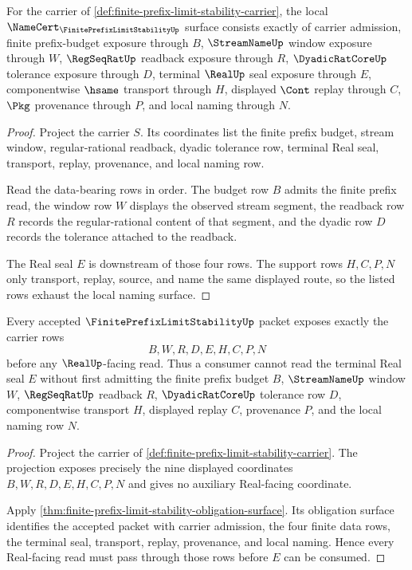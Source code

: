 \begin{theorem}
\label{thm:finite-prefix-limit-stability-obligation-surface}
For the carrier of \autoref{def:finite-prefix-limit-stability-carrier}, the local $\NameCert_{\FinitePrefixLimitStabilityUp}$ surface consists exactly of carrier admission, finite prefix-budget exposure through $B$, $\StreamNameUp$ window exposure through $W$, $\RegSeqRatUp$ readback exposure through $R$, $\DyadicRatCoreUp$ tolerance exposure through $D$, terminal $\RealUp$ seal exposure through $E$, componentwise $\hsame$ transport through $H$, displayed $\Cont$ replay through $C$, $\Pkg$ provenance through $P$, and local naming through $N$.
\end{theorem}
\begin{proof}
Project the carrier $S$. Its coordinates list the finite prefix budget, stream window, regular-rational readback, dyadic tolerance row, terminal Real seal, transport, replay, provenance, and local naming row.

Read the data-bearing rows in order. The budget row $B$ admits the finite prefix read, the window row $W$ displays the observed stream segment, the readback row $R$ records the regular-rational content of that segment, and the dyadic row $D$ records the tolerance attached to the readback.

The Real seal $E$ is downstream of those four rows. The support rows $H,C,P,N$ only transport, replay, source, and name the same displayed route, so the listed rows exhaust the local naming surface.
\end{proof}

\begin{theorem}
\label{thm:finite-prefix-limit-stability-carrier-admission}
Every accepted $\FinitePrefixLimitStabilityUp$ packet exposes exactly the carrier rows
$$
B,W,R,D,E,H,C,P,N
$$
before any $\RealUp$-facing read. Thus a consumer cannot read the terminal Real seal $E$ without first admitting the finite prefix budget $B$, $\StreamNameUp$ window $W$, $\RegSeqRatUp$ readback $R$, $\DyadicRatCoreUp$ tolerance row $D$, componentwise transport $H$, displayed replay $C$, provenance $P$, and the local naming row $N$.
\end{theorem}
\begin{proof}
Project the carrier of \autoref{def:finite-prefix-limit-stability-carrier}. The projection exposes precisely the nine displayed coordinates $B,W,R,D,E,H,C,P,N$ and gives no auxiliary Real-facing coordinate.

Apply \autoref{thm:finite-prefix-limit-stability-obligation-surface}. Its obligation surface identifies the accepted packet with carrier admission, the four finite data rows, the terminal seal, transport, replay, provenance, and local naming. Hence every Real-facing read must pass through those rows before $E$ can be consumed.
\end{proof}


